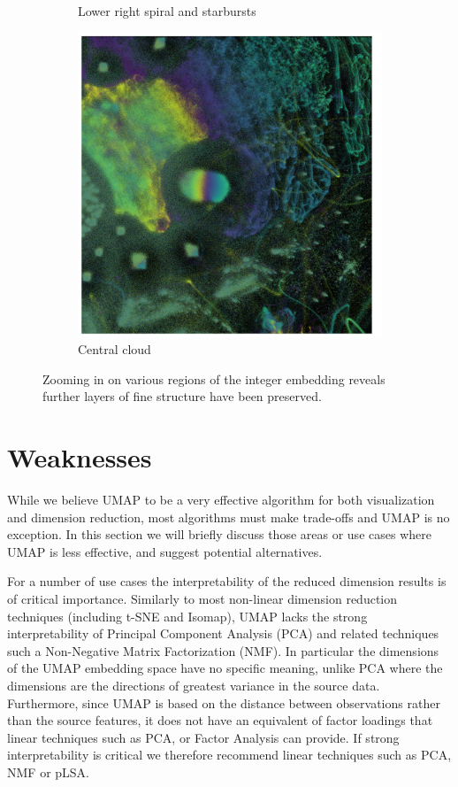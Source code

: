 \documentclass[12pt]{article}
\begin{document}
\begin{figure}
\begin{subfigure}{0.45\textwidth}
        \caption{Lower right spiral and starbursts}
    \end{subfigure}
    \begin{subfigure}{0.45\textwidth}
        \includegraphics[width=\textwidth]{Cloud.png}
        \caption{Central cloud}
    \end{subfigure}
    \caption{Zooming in on various regions of
    the integer embedding reveals further layers of
    fine structure have been preserved.}
    \label{fig:umap_3e7_zoom}
\end{figure}

\section{Weaknesses}\label{weaknesses}

While we believe UMAP to be a very effective algorithm for both visualization and dimension reduction, most algorithms must make trade-offs and UMAP is no exception. In this section we will briefly discuss those areas or use cases where UMAP is less effective, and suggest potential alternatives.

For a number of use cases the interpretability of the reduced dimension results is of critical importance. Similarly to most non-linear dimension reduction techniques (including t-SNE and Isomap), UMAP lacks the strong interpretability of Principal Component Analysis (PCA) and related techniques such a Non-Negative Matrix Factorization (NMF). In particular the dimensions of the UMAP embedding space have no specific meaning, unlike PCA where the dimensions are the directions of greatest variance in the source data. Furthermore, since UMAP is based on the distance between observations rather than the source features, it does not have an equivalent of factor loadings that linear techniques such as PCA, or Factor Analysis can provide. If strong interpretability is critical we therefore recommend linear techniques such as PCA, NMF or pLSA.
\end{document}

